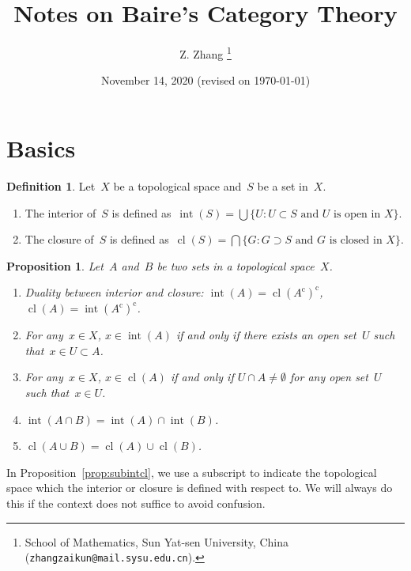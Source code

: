 \documentclass[11pt,a4paper]{article}  %
\title{Notes on Baire's Category Theory}
\date{November 14, 2020 (revised on \today)}
\author{
Z. Zhang
\thanks{
    School of Mathematics, Sun Yat-sen University, China ({\tt zhangzaikun@mail.sysu.edu.cn}).
}
}
\newtheorem{proposition}{Proposition}[section]
\theoremstyle{definition}
\newtheorem{definition}{Definition}[section]
\newcommand{\co}{{\mathrm{c}}}
\DeclareMathOperator{\inter}{int}
\DeclareMathOperator{\cl}{cl}
\numberwithin{equation}{section}
\begin{document}
\maketitle

\section{Basics}

\begin{definition}
  \label{def:intcl}
  Let~$X$ be a topological space and~$S$ be a set in~$X$.
  \begin{enumerate}
    \item The interior of~$S$ is defined as~$\inter(S) = \bigcup\{U \mathrel{:} U\subset S \text{ and } U \text{ is open in } X\}$.
    \item The closure of~$S$ is defined as~$\cl(S) = \bigcap\{G \mathrel{:} G\supset S \text{ and } G \text{ is closed in } X\}$.
  \end{enumerate}
\end{definition}


\begin{proposition}
  \label{prop:intcl}
  Let~$A$ and~$B$ be two sets in a topological space~$X$.
  \begin{enumerate}
    \item Duality between interior and closure: $\inter(A) = \cl(A^\co)^\co$, $\cl(A)=\inter(A^\co)^\co$.
    \item For any~$x\in X$, $x\in \inter(A)$ if and only if there exists an open set~$U$ such that~$x\in U \subset A$.
    \item For any~$x\in X$, $x\in \cl(A)$ if and only if $U\cap A \neq \emptyset$ for any open set~$U$ such that~$x\in U$.
    \item $\inter(A\cap B) = \inter(A)\cap \inter(B)$.
    \item $\cl(A\cup B) = \cl(A)\cup \cl(B)$.
    \end{enumerate}
\end{proposition}

In Proposition~\ref{prop:subintcl}, we use a subscript to indicate the topological space which the
interior or closure is defined with respect to. We will always do this if the context does not
suffice to avoid confusion.
\end{document}
